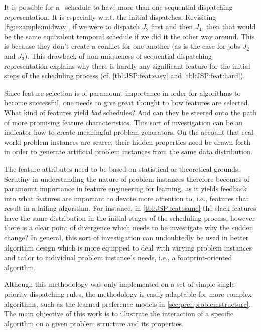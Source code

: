 It is possible for a \JSP\ schedule to have more than one sequential 
dispatching representation. It is especially w.r.t. the initial dispatches. 
Revisiting \cref{fig:example:midway}, if we were to dispatch $J_2$ 
first and then $J_4$, then that would be the same equivalent
temporal schedule if we did it the other way around. 
This is because they don't create a conflict for one another 
(as is the case for jobs $J_2$ and $J_3$). This drawback of non-uniqueness of 
sequential dispatching representation explains why there is hardly any 
significant feature for the initial steps of the scheduling process (cf. 
\cref{tbl:JSP:feat:easy} and \cref{tbl:JSP:feat:hard}). 

Since feature selection is of paramount importance in order for algorithms to become successful, one needs to give great thought to how features are selected. What kind of features yield \emph{bad} schedules? And can they be steered onto the path of more promising feature characteristics. This sort of investigation can be an indicator how to create meaningful problem generators. On the account that real-world problem instances are scarce, their hidden properties need be drawn forth in order to generate artificial problem instances from the same data distribution. 

The feature attributes need to be based on statistical or theoretical grounds. 
Scrutiny in understanding the nature of problem instances therefore becomes of paramount importance in feature engineering for learning, as it yields feedback into what features are important to devote more attention to, i.e., features that result in a failing algorithm. 
For instance, in \cref{tbl:JSP:feat:same} the slack features have the same distribution in the initial stages of the scheduling process, however there is a clear point of divergence which needs to be investigate why the sudden change? 
In general, this sort of investigation can undoubtedly be used in better algorithm design which is more equipped to deal with varying problem instances and tailor to individual problem instance's needs, i.e., a footprint-oriented algorithm. 

Although this methodology was only implemented on a set of simple single-priority dispatching rules, the methodology is easily adaptable for more complex algorithms, such as the learned preference models in \cref{sec:pref:problemstructure}. The main objective of this work is to illustrate the interaction of a specific algorithm on a given problem structure and its properties. 